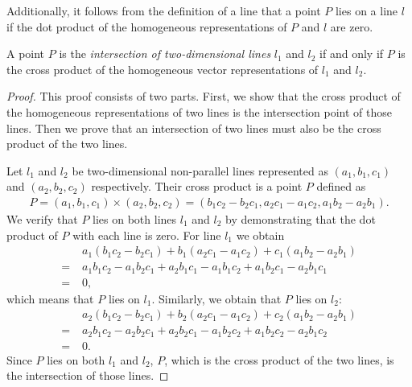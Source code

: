 \documentclass[11pt, oneside, reqno]{book}
\begin{document}
Additionally, it follows from the definition of a line that a point $P$ lies on a line $l$ if the dot product of the homogeneous representations of $P$ and $l$ are zero.

\begin{lemma}
\label{lem:intersect}
A point $P$ is the \textit{intersection of two-dimensional lines} $l_1$ and $l_2$ if and only if $P$ is the cross product of the homogeneous vector representations of $l_1$ and $l_2$.
\end{lemma}
\begin{proof} This proof consists of two parts. First, we show that the cross product of the homogeneous representations of two lines is the intersection point of those lines. Then we prove that an intersection of two lines must also be the cross product of the two lines.

Let $l_1$ and $l_2$ be two-dimensional non-parallel lines represented as $(a_1,b_1,c_1)$ and $(a_2,b_2,c_2)$ respectively. Their cross product is a point $P$ defined as
\begin{align}
	P = (a_1,b_1,c_1) \times (a_2,b_2,c_2) = (b_1c_2-b_2c_1, a_2c_1-a_1c_2, a_1 b_2 - a_2b_1). \label{lineIntersectionCross}
\end{align}
We verify that $P$ lies on both lines $l_1$ and $l_2$ by demonstrating that the dot product of $P$ with each line is zero. For line $l_1$ we obtain
\begin{align*}
 & a_1(b_1c_2-b_2c_1) + b_1(a_2c_1-a_1c_2) + c_1( a_1 b_2 - a_2b_1) \\
=\;& a_1b_1c_2 - a_1b_2c_1 + a_2b_1c_1-a_1b_1c_2 + a_1b_2c_1-a_2b_1c_1 \\
=\; & 0,
\end{align*}
which means that $P$ lies on $l_1$. Similarly, we obtain that $P$ lies on $l_2$:
\begin{align*}
& a_2(b_1c_2-b_2c_1) + b_2(a_2c_1-a_1c_2) + c_2( a_1 b_2 - a_2b_1) \\
=\;& a_2b_1c_2 - a_2b_2c_1 + a_2b_2c_1-a_1b_2c_2 + a_1b_2c_2-a_2b_1c_2 \\
=\;& 0.
\end{align*}
Since $P$ lies on both $l_1$ and $l_2$, $P$, which is the cross product of the two lines, is the intersection of those lines.


\end{proof}
\end{document}
